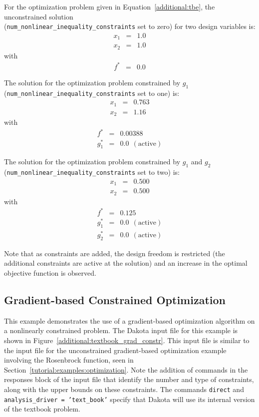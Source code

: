 For the optimization problem given in Equation~\ref{additional:tbe}, the
unconstrained solution\\(\texttt{num\_nonlinear\_inequality\_constraints} 
set to zero) for two design variables is:
\begin{eqnarray*}
    x_1 &=& 1.0 \\
    x_2 &=& 1.0
\end{eqnarray*}
with
\begin{eqnarray*}
    f^{\ast} &=& 0.0
\end{eqnarray*}

The solution for the optimization problem constrained by $g_1$\\
(\texttt{num\_nonlinear\_inequality\_constraints} set to one) is:
\begin{eqnarray*}
    x_1 &=& 0.763 \\
    x_2 &=& 1.16
\end{eqnarray*}
with
\begin{eqnarray*}
      f^{\ast} &=& 0.00388 \\
    g_1^{\ast} &=& 0.0 ~~\mathrm{(active)}
\end{eqnarray*}

The solution for the optimization problem constrained by $g_1$ and $g_2$\\
(\texttt{num\_nonlinear\_inequality\_constraints} set to two) is:
\begin{eqnarray*}
    x_1 &=& 0.500 \\
    x_2 &=& 0.500
\end{eqnarray*}
with
\begin{eqnarray*}
      f^{\ast} &=& 0.125 \\
    g_1^{\ast} &=& 0.0 ~~\mathrm{(active)} \\
    g_2^{\ast} &=& 0.0 ~~\mathrm{(active)}
\end{eqnarray*}

Note that as constraints are added, the design freedom is restricted
(the additional constraints are active at the solution) and an
increase in the optimal objective function is observed.

\subsection{Gradient-based Constrained Optimization}\label{additional:textbook:examples:gradient2}

This example demonstrates the use of a gradient-based optimization
algorithm on a nonlinearly constrained problem. The 
Dakota input file for this example is
shown in Figure~\ref{additional:textbook_grad_constr}. This
input file is similar to the input file for the unconstrained
gradient-based optimization example involving the Rosenbrock
function, seen in Section~\ref{tutorial:examples:optimization}. 
Note the addition of commands in the responses block of
the input file that identify the number and type of constraints, along
with the upper bounds on these constraints. The commands
\texttt{direct} and \texttt{analysis\_driver = 'text\_book'} specify
that Dakota will use its internal version of the textbook problem.

